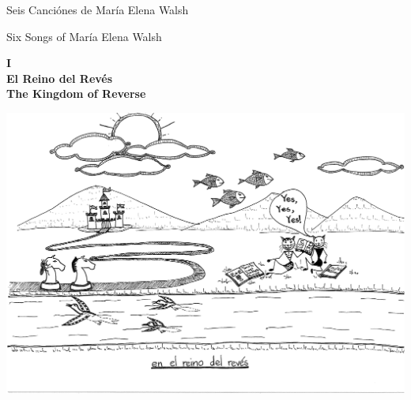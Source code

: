 \documentclass[11pt]{article}
\begin{document}
Seis Canciónes de María Elena Walsh

Six Songs of María Elena Walsh 

\clearpage

\begin{center}
\large
\textbf{
I\\
El Reino del Revés\\
The Kingdom of Reverse
}
\end{center}

\includegraphics[scale=0.5,clip=true,trim = 0in 3mm 0in 0in]{20150406235752619.pdf}
\end{document}
